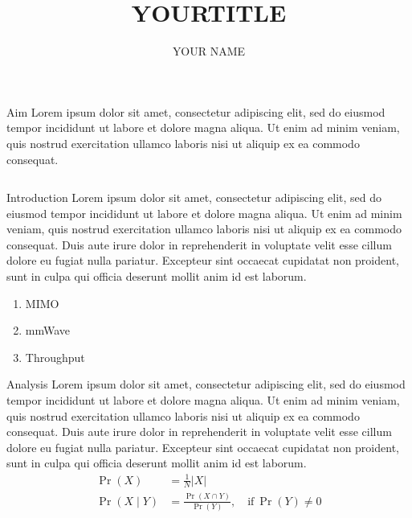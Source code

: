 \documentclass{beamer}
\author[YOUR.NAME@bristol.ac.uk]{YOUR NAME}
\title{YOURTITLE}
\institute{University of Bristol}
\begin{document}
\begin{frame}[fragile]
\begin{center}


\begin{sectionbox}{Aim}
Lorem ipsum dolor sit amet, consectetur adipiscing elit, sed do eiusmod tempor
incididunt ut labore et dolore magna aliqua. Ut enim ad minim veniam, quis
nostrud exercitation ullamco laboris nisi ut aliquip ex ea commodo consequat.
\end{sectionbox}


\begin{columns}[T]
\begin{column}{.48\textwidth}

\begin{sectionbox}{Introduction}
Lorem ipsum dolor sit amet, consectetur adipiscing elit, sed do eiusmod tempor
incididunt ut labore et dolore magna aliqua. Ut enim ad minim veniam, quis
nostrud exercitation ullamco laboris nisi ut aliquip ex ea commodo consequat.
Duis aute irure dolor in reprehenderit in voluptate velit esse cillum dolore eu
fugiat nulla pariatur. Excepteur sint occaecat cupidatat non proident, sunt in
culpa qui officia deserunt mollit anim id est laborum.
\begin{enumerate}
\item MIMO
\item mmWave
\item Throughput
\end{enumerate}
\end{sectionbox}


\begin{sectionbox}{Analysis}
Lorem ipsum dolor sit amet, consectetur adipiscing elit, sed do eiusmod tempor
incididunt ut labore et dolore magna aliqua. Ut enim ad minim veniam, quis
nostrud exercitation ullamco laboris nisi ut aliquip ex ea commodo consequat.
Duis aute irure dolor in reprehenderit in voluptate velit esse cillum dolore eu
fugiat nulla pariatur. Excepteur sint occaecat cupidatat non proident, sunt in
culpa qui officia deserunt mollit anim id est laborum.
\begin{align}
\label{eq:pr}
\Pr(X) &= \frac{1}{N} \left| X \right|
\\
\label{eq:bayes} %
\Pr(X \mid Y) &= \frac{\Pr(X \cap Y)}{\Pr(Y)},
    \quad \text{if}\ \Pr(Y) \neq 0
\end{align}
\end{sectionbox}

\end{column}


\end{columns}
\end{center}
\end{frame}
\end{document}
